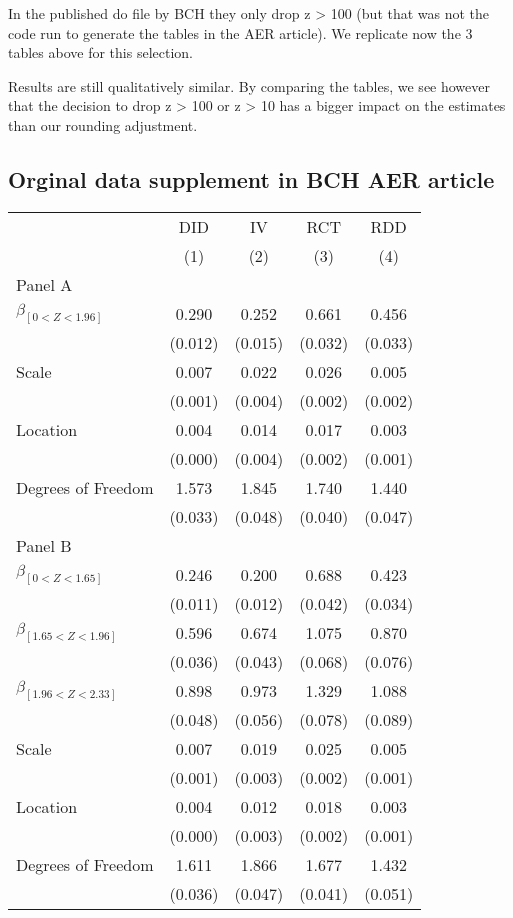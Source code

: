 \documentclass[
]{article}
\begin{document}
In the published do file by BCH they only drop z \textgreater{} 100 (but
that was not the code run to generate the tables in the AER article). We
replicate now the 3 tables above for this selection.

Results are still qualitatively similar. By comparing the tables, we see
however that the decision to drop z \textgreater{} 100 or z
\textgreater{} 10 has a bigger impact on the estimates than our rounding
adjustment.

\hypertarget{orginal-data-supplement-in-bch-aer-article-1}{%
\subsection{Orginal data supplement in BCH AER
article}\label{orginal-data-supplement-in-bch-aer-article-1}}

\def\sym#1{\ifmmode^{#1}\else\(^{#1}\)\fi} \begin{tabular}{l*{4}{c}} \hline\hline & \multicolumn{1}{c}{DID} &  \multicolumn{1}{c}{IV} &  \multicolumn{1}{c}{RCT} &  \multicolumn{1}{c}{RDD}\\  & \multicolumn{1}{c}{(1)} &  \multicolumn{1}{c}{(2)} &  \multicolumn{1}{c}{(3)} &  \multicolumn{1}{c}{(4)}\\  \hline \hline  Panel A \\  $\beta_{[0 < Z < 1.96]}$ & 0.290 &  0.252 &  0.661 &  0.456\\ & (0.012) &  (0.015) &  (0.032) &  (0.033)\\  Scale & 0.007 &  0.022 &  0.026 &  0.005\\ & (0.001) &  (0.004) &  (0.002) &  (0.002) \\  Location & 0.004 &  0.014 &  0.017 &  0.003\\ & (0.000) &  (0.004) &  (0.002) &  (0.001) \\  Degrees of Freedom & 1.573 &  1.845 &  1.740 &  1.440\\ & (0.033) &  (0.048) &  (0.040) &  (0.047)\\ Panel B \\  $\beta_{[0 < Z < 1.65]}$ & 0.246 &  0.200 &  0.688 &  0.423\\ & (0.011) &  (0.012) &  (0.042) &  (0.034)\\  $\beta_{[1.65 < Z < 1.96]}$ & 0.596 &  0.674 &  1.075 &  0.870\\ & (0.036) &  (0.043) &  (0.068) &  (0.076)\\   $\beta_{[1.96 < Z < 2.33]}$ & 0.898 &  0.973 &  1.329 &  1.088\\ & (0.048) &  (0.056) &  (0.078) &  (0.089)\\  Scale & 0.007 &  0.019 &  0.025 &  0.005\\ & (0.001) &  (0.003) &  (0.002) &  (0.001) \\  Location & 0.004 &  0.012 &  0.018 &  0.003\\ & (0.000) &  (0.003) &  (0.002) &  (0.001) \\  Degrees of Freedom & 1.611 &  1.866 &  1.677 &  1.432\\ & (0.036) &  (0.047) &  (0.041) &  (0.051)\\  \hline\hline \end{tabular}
\end{document}
